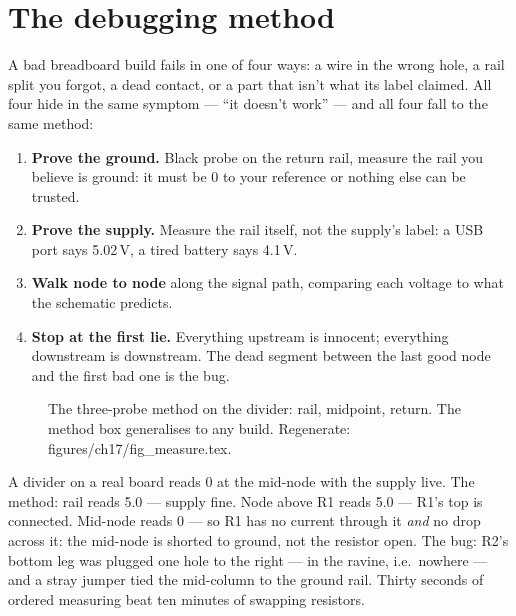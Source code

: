 \section{The debugging method}\label{sec:dmm17}

A bad breadboard build fails in one of four ways: a wire in the
wrong hole, a rail split you forgot, a dead contact, or a part that
isn't what its label claimed. All four hide in the same symptom ---
``it doesn't work'' --- and all four fall to the same method:

\begin{enumerate}
\item \textbf{Prove the ground.} Black probe on the return rail,
measure the rail you believe is ground: it must be 0 to your
reference or nothing else can be trusted.
\item \textbf{Prove the supply.} Measure the rail itself, not the
supply's label: a USB port says 5.02\,V, a tired battery says 4.1\,V.
\item \textbf{Walk node to node} along the signal path, comparing
each voltage to what the schematic predicts.
\item \textbf{Stop at the first lie.} Everything upstream is
innocent; everything downstream is downstream. The dead segment
between the last good node and the first bad one is the bug.
\end{enumerate}

\begin{figure}[htbp]
\centering

\caption{The three-probe method on the divider: rail, midpoint,
return. The method box generalises to any build. Regenerate:
\ttfamily figures/ch17/fig\_measure.tex.}
\label{fig:measure17}
\end{figure}

\begin{example}
A divider on a real board reads 0 at the mid-node with the supply
live. The method: rail reads 5.0 --- supply fine. Node above R1 reads
5.0 --- R1's top is connected. Mid-node reads 0 --- so R1 has no
current through it \emph{and} no drop across it: the mid-node is
shorted to ground, not the resistor open. The bug: R2's bottom leg
was plugged one hole to the right --- in the ravine, i.e.\ nowhere
--- and a stray jumper tied the mid-column to the ground rail.
Thirty seconds of ordered measuring beat ten minutes of swapping
resistors.
\end{example}

